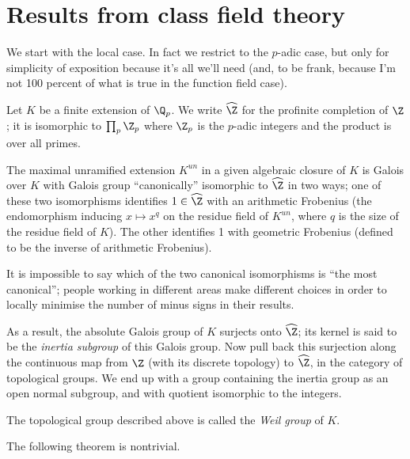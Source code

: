 \section{Results from class field theory}

We start with the local case. In fact we restrict to the $p$-adic case, but only for simplicity of exposition because it's all we'll need (and, to be frank, because I'm not 100 percent of what is true in the function field case).

Let $K$ be a finite extension of $\Q_p$. We write $\widehat{\Z}$ for the profinite completion of $\Z$; it is isomorphic to $\prod_p\Z_p$ where $\Z_p$ is the $p$-adic integers and the product is over all primes.

\begin{theorem}\label{maximal_unramified_extension_of_p-adic_field}\notready The maximal unramified extension $K^{un}$ in a given algebraic closure of $K$
    is Galois over $K$ with Galois group ``canonically'' isomorphic to $\widehat{\Z}$ in two ways; one of these two isomorphisms identifies $1\in\widehat{\Z}$ with an arithmetic Frobenius (the endomorphism inducing $x\mapsto x^q$ on the residue field of $K^{un}$, where $q$ is the size of the residue field of $K$). The other identifies 1 with geometric Frobenius (defined to be the inverse of arithmetic Frobenius).
\end{theorem}

It is impossible to say which of the two canonical isomorphisms is ``the most canonical''; people working in different areas make different choices in order to locally minimise the number of minus signs in their results.

As a result, the absolute Galois group of $K$ surjects onto $\widehat{\Z}$; its kernel is said to be the \emph{inertia subgroup} of this Galois group. Now pull back this surjection along the continuous map from $\Z$ (with its discrete topology) to $\widehat{\Z}$, in the category of topological groups. We end up with a group containing the inertia group as an open normal subgroup, and with quotient isomorphic to the integers.

\begin{definition}\label{local_Weil_group}\notready The topological group described above is called the \emph{Weil group} of $K$.
\end{definition}

The following theorem is nontrivial.

